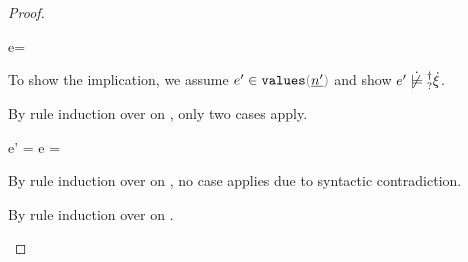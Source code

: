 \begin{proof}
\begin{byCases}
\begin{byCases}
      \begin{byCases}
      \item[\text{(\ref{rule:VNum}) and (\ref{rule:TNum})}]
        \begin{pfsteps}
        \item e= 
        \end{pfsteps}
        To show the implication, we assume $\inValues{e'}{\hnum{n'}}$ and show
        $\cnotsatisfyormay{e'}{\hxi}$.
        \begin{pfsteps}
        \item {}  
        \end{pfsteps}
        By rule induction over  on
        , only two cases apply.
        \begin{byCases}
        \item[\text{(\ref{rule:IVVal})}]
          \begin{pfsteps}
          \item e' = e =  
          \item {} 
          \end{pfsteps}
        \item[\text{(\ref{rule:IVIndet})}]
          \begin{pfsteps}
          \item {}  
          \end{pfsteps}
          By rule induction over  on
          , no case applies due to syntactic contradiction.
        \end{byCases}
      \end{byCases}
    \item[\text{(\ref{rule:FIndet})}]
      \begin{pfsteps}
        \item {}  
      \end{pfsteps}
    By rule induction over  on .
      \begin{byCases}
        \item[\text{(\ref{rule:IEHole})}]
        \begin{pfsteps*}

\end{pfsteps*}
\end{byCases}
\end{byCases}
\end{byCases}
\end{proof}
